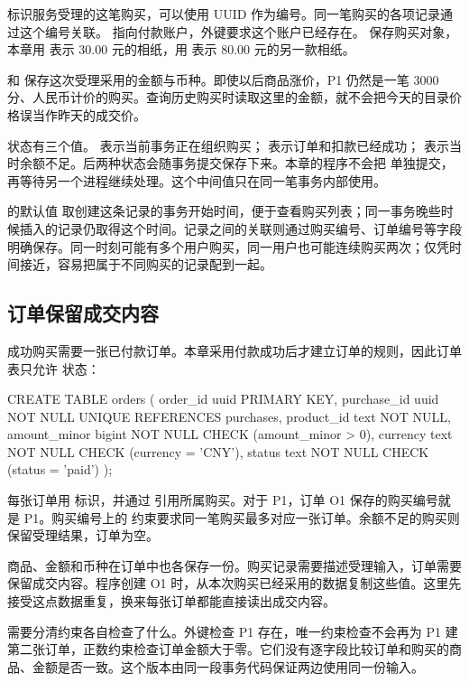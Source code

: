  标识服务受理的这笔购买，可以使用 UUID 作为编号。同一笔购买的各项记录通过这个编号关联。 指向付款账户，外键要求这个账户已经存在。 保存购买对象，本章用  表示 30.00 元的相纸，用  表示 80.00 元的另一款相纸。

 和  保存这次受理采用的金额与币种。即使以后商品涨价，P1 仍然是一笔 3000 分、人民币计价的购买。查询历史购买时读取这里的金额，就不会把今天的目录价格误当作昨天的成交价。

状态有三个值。 表示当前事务正在组织购买； 表示订单和扣款已经成功； 表示当时余额不足。后两种状态会随事务提交保存下来。本章的程序不会把  单独提交，再等待另一个进程继续处理。这个中间值只在同一笔事务内部使用。

 的默认值  取创建这条记录的事务开始时间，便于查看购买列表；同一事务晚些时候插入的记录仍取得这个时间。记录之间的关联则通过购买编号、订单编号等字段明确保存。同一时刻可能有多个用户购买，同一用户也可能连续购买两次；仅凭时间接近，容易把属于不同购买的记录配到一起。

\subsection*{订单保留成交内容}

成功购买需要一张已付款订单。本章采用付款成功后才建立订单的规则，因此订单表只允许  状态：

\begin{BookCode}
CREATE TABLE orders (
    order_id      uuid PRIMARY KEY,
    purchase_id   uuid NOT NULL UNIQUE REFERENCES purchases,
    product_id    text NOT NULL,
    amount_minor  bigint NOT NULL CHECK (amount_minor > 0),
    currency      text NOT NULL CHECK (currency = 'CNY'),
    status        text NOT NULL CHECK (status = 'paid')
);
\end{BookCode}

每张订单用  标识，并通过  引用所属购买。对于 P1，订单 O1 保存的购买编号就是 P1。购买编号上的  约束要求同一笔购买最多对应一张订单。余额不足的购买则保留受理结果，订单为空。

商品、金额和币种在订单中也各保存一份。购买记录需要描述受理输入，订单需要保留成交内容。程序创建 O1 时，从本次购买已经采用的数据复制这些值。这里先接受这点数据重复，换来每张订单都能直接读出成交内容。

需要分清约束各自检查了什么。外键检查 P1 存在，唯一约束检查不会再为 P1 建第二张订单，正数约束检查订单金额大于零。它们没有逐字段比较订单和购买的商品、金额是否一致。这个版本由同一段事务代码保证两边使用同一份输入。

